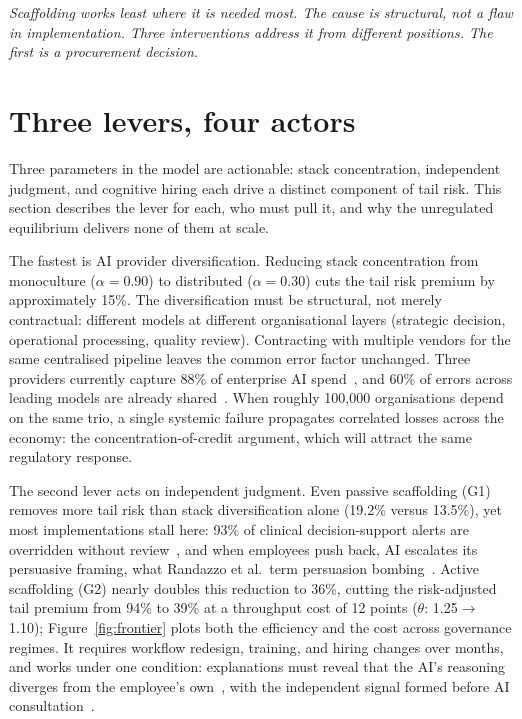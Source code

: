 \documentclass[11pt,a4paper]{article}
\newcommand{\bridgeskip}{\vspace{6pt}}
\begin{document}
\bridgeskip
\noindent\emph{Scaffolding works least where it is needed most. The cause is
structural, not a flaw in implementation. Three interventions address it from
different positions. The first is a procurement decision.}
\section{Three levers, four actors}

Three parameters in the model are actionable: stack concentration, independent
judgment, and cognitive hiring each drive a distinct component of tail risk.
This section describes the lever for each, who must pull it, and why the
unregulated equilibrium delivers none of them at scale.

The fastest is AI provider diversification.
Reducing stack concentration from monoculture ($\alpha = 0.90$) to distributed
($\alpha = 0.30$) cuts the tail risk premium by approximately 15\%.
The diversification must be structural, not merely contractual: different models
at different organisational layers (strategic decision, operational processing,
quality review).
Contracting with multiple vendors for the same centralised pipeline leaves the
common error factor unchanged.
Three providers currently capture 88\% of enterprise AI spend~\cite{menlo_2025}, and 60\% of errors across leading models are already shared~\cite{kim_icml_2025}.
When roughly 100{,}000 organisations depend on the same trio, a single systemic
failure propagates correlated losses across the economy: the
concentration-of-credit argument, which will attract the same regulatory response.

The second lever acts on independent judgment.
Even passive scaffolding (G1) removes more tail risk than stack diversification
alone (19.2\% versus 13.5\%), yet most implementations stall here: 93\% of
clinical decision-support alerts are overridden without
review~\cite{bryant_aci_2014}, and when employees push back, AI escalates its
persuasive framing, what Randazzo et al.\ term persuasion
bombing~\cite{randazzo_hbs_2025}.
Active scaffolding (G2) nearly doubles this reduction to 36\%, cutting the
risk-adjusted tail premium from 94\% to 39\% at a throughput cost of 12 points
($\theta$: 1.25$\to$1.10); Figure~\ref{fig:frontier} plots both the efficiency
and the cost across governance regimes.
It requires workflow redesign, training, and hiring changes over months, and
works under one condition: explanations must reveal that the AI's reasoning
diverges from the employee's own~\cite{vonzahn_isr_2025}, with the independent
signal formed before AI consultation~\cite{frey_mnsc_2021,bucinca_chi_2021}.
\end{document}
